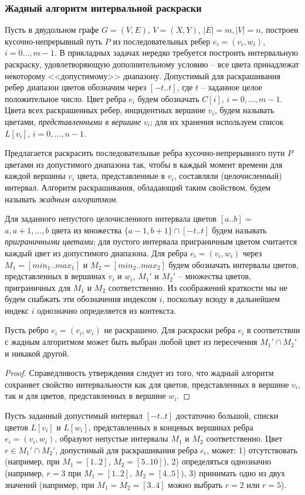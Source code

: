 \subsubsection {Жадный алгоритм интервальной раскраски}
\label{subsec22}
Пусть в двудольном графе ${G=(V,E)}$, ${V=(X,Y)}$, ${|E|=m},{|V|=n}$, построен кусочно-непрерывный путь $P$ из последовательных ребер ${e_i= (v_i,w_i)}$, $i=0\dots,m-1$. В прикладных задачах нередко требуется построить интервальную раскраску, удовлетворяющую дополнительному условию -- все цвета принадлежат некоторому <<допустимому>> диапазону. Допустимый для раскрашивания ребер диапазон цветов обозначим через $[-t..t]$, где $t$ -- заданное целое положительное число. Цвет ребра $e_i$ будем обозначать $C[i]$, $i= 0, \dots, m-1$. Цвета всех раскрашенных ребер, инцидентных вершине $v_i$, будем называть цветами, \textit{ представленными в вершине} $v_i$; для их хранения используем список $L[v_i]$, ${i=0, \dots, n-1}$.
\par\medskip
Предлагается раскрасить последовательные ребра кусочно-непрерывного пути $P$ цветами из допустимого диапазона так, чтобы в каждый момент времени для каждой вершины $v_i$ цвета, представленные в $v_i$, составляли (целочисленный) интервал. Алгоритм раскрашивания, обладающий таким свойством, будем называть \textit{ жадным алгоритмом}.
\par\medskip
Для заданного непустого целочисленного интервала цветов ${[a..b] =}$ ${a,a+1,\dots,b}$ цвета из множества $\{a-1, b+1\}
\cap {[-t..t]}$ будем называть \textit{ приграничными цветами}; для пустого интервала приграничным цветом считается каждый цвет из допустимого диапазона.
Для ребра $e_i=(v_i,w_i)$ через ${M_1=}{[min_1..max_1]}$ и ${M_2=}{[min_2..max_2]}$ будем обозначать интервалы цветов, представленных в вершинах $v_i$ и  $w_i$, $M_1'$ и $M_2'$ -- множества цветов, приграничных для $M_1$ и $M_2$ соответственно. Из соображений краткости мы не будем снабжать эти обозначения индексом $i$, поскольку всюду в дальнейшем индекс $i$ однозначно определяется из контекста.

\begin{state}\label{St2}
Пусть ребро $e_i=(v_i,w_i)$ не раскрашено. Для раскраски ребра $e_i$ в соответствии с жадным алгоритмом может быть выбран любой цвет из пересечения
$M_1'\cap M_2'$ и никакой другой.
\end{state}
\begin{proof}
Справедливость утверждения следует из того, что жадный алгоритм сохраняет свойство интервальности как для цветов, представленных в вершине $v_i$, так и для цветов, представленных в вершине  $w_i$.
\end{proof}
Пусть заданный допустимый интервал $[-t..t]$ достаточно большой, списки цветов $L[v_i]$ и $L[w_i]$, представленных в концевых вершинах ребра ${e_i=(v_i,w_i)}$, образуют непустые интервалы $M_1$ и $M_2$ соответственно. Цвет $r \in M_1'\cap M_2'$, допустимый для раскрашивания ребра $e_i$, может: 1) отсутствовать (например, при $M_1=[1..2]$, $M_2=[5..10]$), 2) определяться однозначно (например, $r=3$ при $M_1=[1..2]$, $M_2=[4..5]$), 3) принимать одно из двух значений (например, при $M_1=M_2=[3..4]$ можно выбрать $r=2$ или $r=5$).

